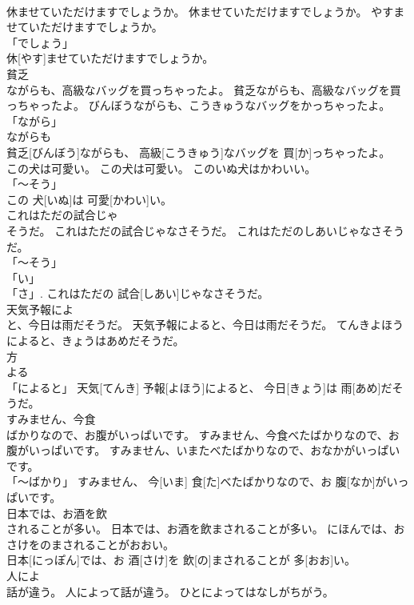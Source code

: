 \documentclass[8pt]{extreport}
\begin{document}
\begin{CJK}{UTF8}{min}
\\	休ませていただけますでしょうか。	休ませていただけますでしょうか。	やすませていただけますでしょうか。	
\\	「でしょう」 
\\	休[やす]ませていただけますでしょうか。		
\\	貧乏
\\	ながらも、高級なバッグを買っちゃったよ。	貧乏ながらも、高級なバッグを買っちゃったよ。	びんぼうながらも、こうきゅうなバッグをかっちゃったよ。	
\\	「ながら」 
\\	ながらも 
\\	貧乏[びんぼう]ながらも、 高級[こうきゅう]なバッグを 買[か]っちゃったよ。		
\\	この犬は可愛い。	この犬は可愛い。	このいぬ犬はかわいい。	
\\	「～そう」 
\\	この 犬[いぬ]は 可愛[かわい]い。		
\\	これはただの試合じゃ
\\	そうだ。	これはただの試合じゃなさそうだ。	これはただのしあいじゃなさそうだ。	
\\	「～そう」 
\\	「い」 
\\	「さ」.	これはただの 試合[しあい]じゃなさそうだ。		
\\	天気予報によ
\\	と、今日は雨だそうだ。	天気予報によると、今日は雨だそうだ。	てんきよほうによると、きょうはあめだそうだ。	
\\	方 
\\	よる 
\\	「によると」	天気[てんき] 予報[よほう]によると、 今日[きょう]は 雨[あめ]だそうだ。		
\\	すみません、今食
\\	ばかりなので、お腹がいっぱいです。	すみません、今食べたばかりなので、お腹がいっぱいです。	すみません、いまたべたばかりなので、おなかがいっぱいです。	
\\	「～ばかり」	すみません、 今[いま] 食[た]べたばかりなので、お 腹[なか]がいっぱいです。		
\\	日本では、お酒を飲
\\	されることが多い。	日本では、お酒を飲まされることが多い。	にほんでは、おさけをのまされることがおおい。	
\\	日本[にっぽん]では、お 酒[さけ]を 飲[の]まされることが 多[おお]い。		
\\	人によ
\\	話が違う。	人によって話が違う。	ひとによってはなしがちがう。	

\end{CJK}
\end{document}
